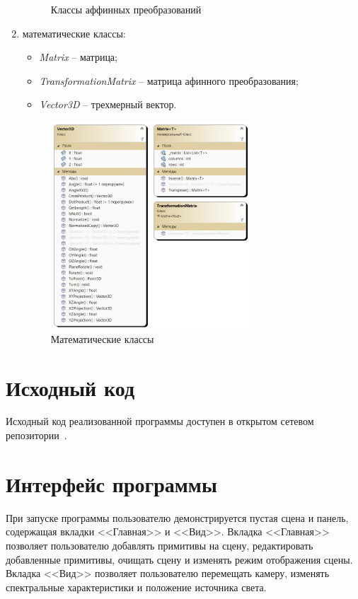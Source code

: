 \begin{enumerate}
\begin{figure}[h]
		\caption{Классы аффинных преобразований} 
		\label{fig:transformation-class} 
	\end{figure}
	\item математические классы:
	\begin{itemize}[label=--]
		\item \textit{Matrix} -- матрица;
		\item \textit{TransformationMatrix} -- матрица афинного преобразования;
		\item \textit{Vector3D} -- трехмерный вектор.
	\end{itemize}
	\begin{figure}[h] 
		\centering
		\includegraphics[width=0.7\textwidth]{images/math-class.png}
		\caption{Математические классы} 
		\label{fig:math-class} 
	\end{figure}
\end{enumerate}

\section{Исходный код}

Исходный код реализованной программы доступен в открытом сетевом репозитории~\cite{lit11}.

\section{Интерфейс программы}

При запуске программы пользователю демонстрируется пустая сцена и панель, содержащая вкладки <<Главная>> и <<Вид>>. Вкладка <<Главная>> позволяет пользователю добавлять примитивы на сцену, редактировать добавленные примитивы, очищать сцену и изменять режим отображения сцены. Вкладка <<Вид>> позволяет пользователю перемещать камеру, изменять спектральные характеристики и положение источника света.

